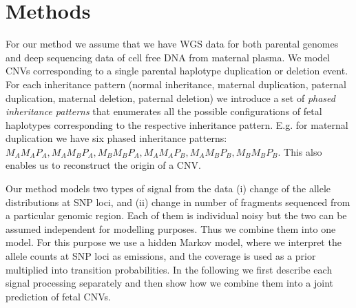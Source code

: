 \section{Methods}
For our method we assume that we have WGS data for both parental genomes and deep sequencing data of cell free DNA from maternal plasma. We model CNVs corresponding to a single parental haplotype duplication or deletion event. For each inheritance pattern (normal inheritance, maternal duplication, paternal duplication, maternal deletion, paternal deletion) we introduce a set of \emph{phased inheritance patterns} that enumerates all the possible configurations of fetal haplotypes corresponding to the respective inheritance pattern. E.g. for maternal duplication we have six phased inheritance patterns: $M_AM_AP_A, M_AM_BP_A, M_BM_BP_A, M_AM_AP_B, M_AM_BP_B, M_BM_BP_B$. This also enables us to reconstruct the origin of a CNV.

Our method models two types of signal from the data (i) change of the allele distributions at SNP loci, and (ii) change in number of fragments sequenced from a particular genomic region. Each of them is individual noisy but the two can be assumed independent for modelling purposes. Thus we combine them into one model. For this purpose we use a hidden Markov model, where we interpret the allele counts at SNP loci as emissions, and the coverage is used as a prior multiplied into transition probabilities. In the following we first describe each signal processing separately and then show how we combine them into a joint prediction of fetal CNVs.

